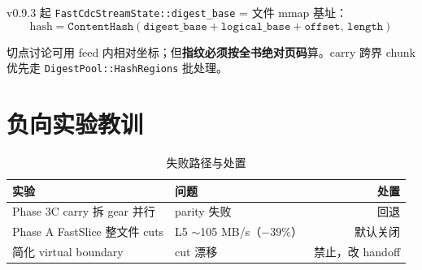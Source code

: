 v0.9.3 起 \texttt{FastCdcStreamState::digest\_base} = 文件 mmap 基址：
\[
\text{hash} = \texttt{ContentHash}(\texttt{digest\_base} + \texttt{logical\_base} + \texttt{offset},\,\texttt{length})
\]

\begin{analogybox}
切点讨论可用 feed 内相对坐标；但\textbf{指纹必须按全书绝对页码}算。carry 跨界 chunk 优先走 \texttt{DigestPool::HashRegions} 批处理。
\end{analogybox}

\section{负向实验教训}

\begin{table}[htbp]
\centering
\caption{失败路径与处置}
\label{tab:negative}
\small
\begin{tabular}{@{}llr@{}}
\toprule
实验 & 问题 & 处置 \\
\midrule
Phase 3C carry 拆 gear 并行 & parity 失败 & 回退 \\
Phase A FastSlice 整文件 cuts & L5 $\sim$105 MB/s（$-39\%$） & 默认关闭 \\
简化 virtual boundary & cut 漂移 & 禁止，改 handoff \\
\bottomrule
\end{tabular}
\end{table}
